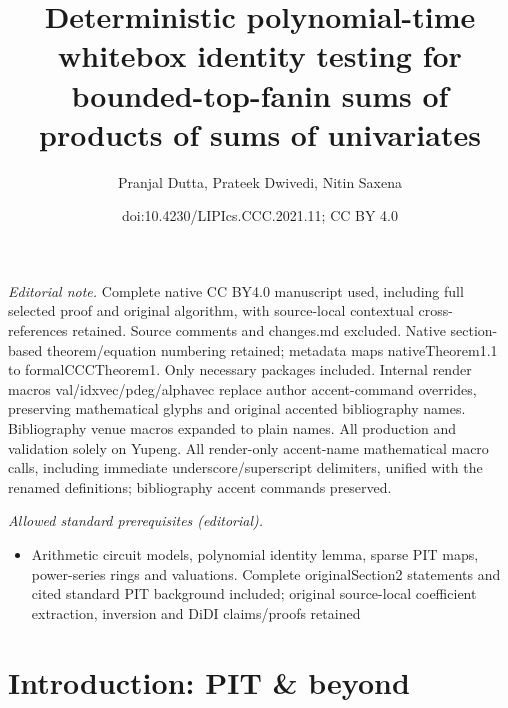 \documentclass[10pt,a4paper]{article}
\title{Deterministic polynomial-time whitebox identity testing for bounded-top-fanin sums of products of sums of univariates}
\author{Pranjal Dutta, Prateek Dwivedi, Nitin Saxena}
\date{doi:10.4230/LIPIcs.CCC.2021.11; CC BY 4.0}
\numberwithin{equation}{section}
\begin{document}
\maketitle
\noindent\textit{Editorial note.} Complete native CC BY4.0 manuscript used, including full selected proof and original algorithm, with source-local contextual cross-references retained. Source comments and changes.md excluded. Native section-based theorem/equation numbering retained; metadata maps nativeTheorem1.1 to formalCCCTheorem1. Only necessary packages included. Internal render macros val/idxvec/pdeg/alphavec replace author accent-command overrides, preserving mathematical glyphs and original accented bibliography names. Bibliography venue macros expanded to plain names. All production and validation solely on Yupeng. All render-only accent-name mathematical macro calls, including immediate underscore/superscript delimiters, unified with the renamed definitions; bibliography accent commands preserved.\par\medskip
\noindent\textit{Allowed standard prerequisites (editorial).}\begin{itemize}
\item Arithmetic circuit models, polynomial identity lemma, sparse PIT maps, power-series rings and valuations. Complete originalSection2 statements and cited standard PIT background included; original source-local coefficient extraction, inversion and DiDI claims/proofs retained
\end{itemize}\medskip
\section{Introduction: PIT \& beyond}
\end{document}
